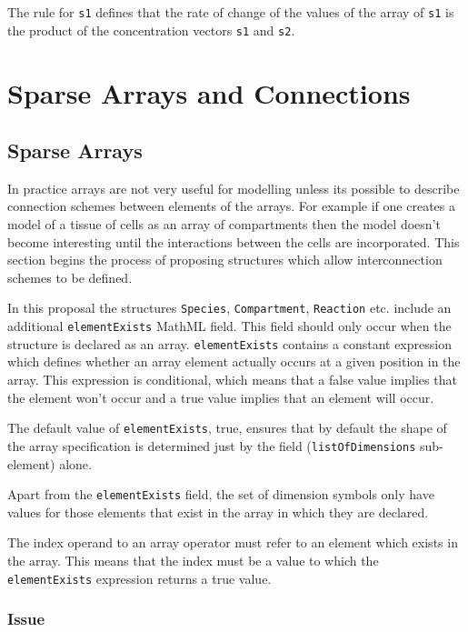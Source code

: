 \documentclass{cekarticle}
\begin{document}
The rule for \texttt{s1} defines that the rate of change of the
values of the array of \texttt{s1} is the product of the concentration vectors
\texttt{s1} and \texttt{s2}.

\section{Sparse Arrays and Connections}

\subsection{Sparse Arrays}

In practice arrays are not very useful for modelling unless its
possible to describe connection schemes between elements of the
arrays.  For example if one creates a model of a tissue of cells
as an array of compartments then the model doesn't become
interesting until the interactions between the cells are
incorporated.  This section begins the process of proposing
structures which allow interconnection schemes to be defined.

In this proposal the structures \texttt{Species},
\texttt{Compartment}, \texttt{Reaction} etc. include an additional \texttt{elementExists}
MathML field.  This field should only occur when the structure is
declared as an array.  \texttt{elementExists} contains a constant
expression which defines whether an array element actually occurs
at a given position in the array.  This expression is
conditional, which means that a false value implies that
the element won't occur and a true value implies that
an element will occur.

The default value of \texttt{elementExists}, true, ensures that by
default the shape of the array specification is determined just
by the  field (\texttt{listOfDimensions} sub-element) alone.

Apart from the \texttt{elementExists} field, the set of dimension
symbols only have values for those elements that exist in the
array in which they are declared.

The index operand to an array operator must refer to an element
which exists in the array.  This means that the index must be a
value to which the \texttt{elementExists} expression returns a
true value.

\subsubsection{Issue}
\end{document}
